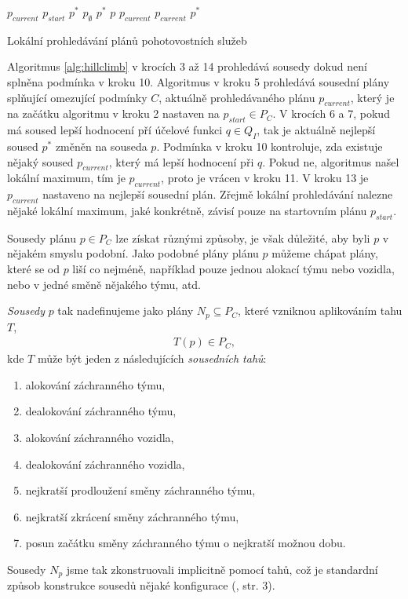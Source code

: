 \begin{algorithm}[H]
  \begin{algorithmic}[1]
    \State $p_{current}$ \gets $p_{start}$
      \State $p^*$ \gets $p_{\emptyset}$ 
          \State $p^*$ \gets $p$
        \EndIf
      \EndFor
        \State \Return $p_{current}$
      \EndIf
      \State $p_{current}$ \gets $p^*$
    \EndWhile
  \EndFunction
  \end{algorithmic}
  \caption{Lokální prohledávání plánů pohotovostních služeb}
  \label{alg:hillclimb}
\end{algorithm}

Algoritmus \ref{alg:hillclimb} v krocích 3 až 14 prohledává sousedy dokud není splněna podmínka v kroku 10.
Algoritmus v kroku 5 prohledává sousední plány splňující omezující podmínky $C$, aktuálně prohledávaného plánu $p_{current}$, který je na začátku algoritmu v kroku 2 nastaven na $p_{start} \in P_C$.
V krocích 6 a 7, pokud má soused lepší hodnocení pří účelové funkci $q \in Q_I$, tak je aktuálně nejlepší soused $p^*$ změněn na souseda $p$.
Podmínka v kroku 10 kontroluje, zda existuje nějaký soused $p_{current}$, který má lepší hodnocení při $q$.
Pokud ne, algoritmus našel lokální maximum, tím je $p_{current}$, proto je vrácen v kroku 11.
V kroku 13 je $p_{current}$ nastaveno na nejlepší sousední plán.
Zřejmě lokální prohledávání nalezne nějaké lokální maximum, jaké konkrétně, závisí pouze na startovním plánu $p_{start}$.

Sousedy plánu $p \in P_C$ lze získat různými způsoby, je však důležité, aby byli $p$ v nějakém smyslu podobní.
Jako podobné plány plánu $p$ můžeme chápat plány, které se od $p$ liší co nejméně, například pouze jednou alokací týmu nebo vozidla,
nebo v jedné směně nějakého týmu, atd.\

\textit{Sousedy} $p$ tak nadefinujeme jako plány $N_p \subseteq P_C$, které vzniknou aplikováním tahu $T$,
\begin{align*}
  T(p) \in P_C,
\end{align*}
kde $T$ může být jeden z následujících \textit{sousedních tahů}:
\begin{enumerate}
  \item alokování záchranného týmu,
  \item dealokování záchranného týmu,
  \item alokování záchranného vozidla,
  \item dealokování záchranného vozidla,
  \item nejkratší prodloužení směny záchranného týmu,
  \item nejkratší zkrácení směny záchranného týmu,
  \item posun začátku směny záchranného týmu o nejkratší možnou dobu.
\end{enumerate}
Sousedy $N_p$ jsme tak zkonstruovali implicitně pomocí tahů, což je standardní způsob konstrukce sousedů nějaké konfigurace (\cite{HybridMeta}, str. 3).

